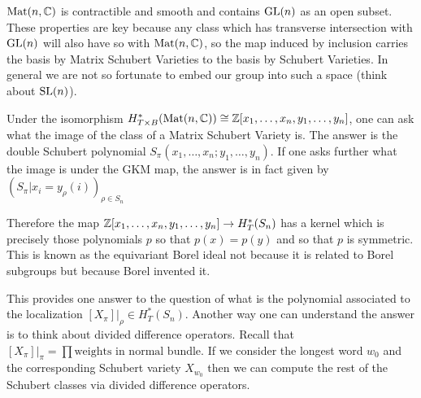 \documentclass[12pt]{article}
\begin{document}
\hfill

$\operatorname{Mat}(n,\mathbb{C})$ is contractible and smooth and contains $\operatorname{GL}(n)$ as an open subset. These properties are key because any class
which has transverse intersection with $\operatorname{GL}(n)$ will also have so with $\operatorname{Mat}(n,\mathbb{C})$, so the map induced by inclusion carries the basis by
Matrix Schubert Varieties to the basis by Schubert Varieties. In general we are not so fortunate to embed our group into such a space (think about $\operatorname{SL}(n)$).

\hfill

Under the isomorphism $H_{T\times B}^*(\operatorname{Mat}(n,\mathbb{C})) \cong \mathbb{Z}[x_1,\dots,x_n,y_1,\dots,y_n]$, one can ask what the image of the class of a
Matrix Schubert Variety is. The answer is the double Schubert polynomial $S_\pi(x_1,\dots,x_n;y_1,\dots,y_n)$. If one asks further
what the image is under the GKM map, the answer is in fact given by $(S_\pi|x_i = y_\rho(i))_{\rho\in S_n}$

\hfill

Therefore the map $\mathbb{Z}[x_1,\dots,x_n,y_1,\dots,y_n] \to H_T^*(S_n)$ has a kernel which is precisely
those polynomials $p$ so that $p(x) = p(y)$ and so that $p$ is symmetric. This is known as the
equivariant Borel ideal not because it is related to Borel subgroups but because Borel invented it.

\hfill

This provides one answer to the question of what is the polynomial associated to the localization
$[X_\pi]\vert_{\rho} \in H_T^*(S_n)$. Another way one can understand the answer is to think about divided difference
operators. Recall that $[X_\pi]\vert_{\pi} = \prod \text{weights in normal bundle}$. If we consider the longest word
$w_0$ and the corresponding Schubert variety $X_{w_0}$ then we can compute the rest of the Schubert classes via
divided difference operators.
\end{document}

